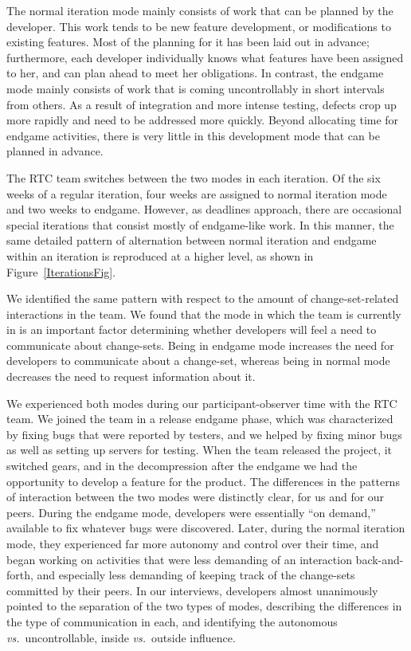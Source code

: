 The normal iteration mode mainly consists of work that can be planned by the developer. This work tends to be new feature development, or modifications to existing features. Most of the planning for it has been laid out in advance; furthermore, each developer individually knows what features have been assigned to her, and can plan ahead to meet her obligations.
In contrast, the endgame mode mainly consists of work that is coming uncontrollably in short intervals from others. As a result of integration and more intense testing, defects crop up more rapidly and need to be addressed more quickly. Beyond allocating time for endgame activities, there is very little in this development mode that can be planned in advance.

The RTC team switches between the two modes in each iteration. Of the six weeks of a regular iteration, four weeks are assigned to normal iteration mode and two weeks to endgame. However, as deadlines approach, there are occasional special iterations that consist mostly of endgame-like work. In this manner, the same detailed pattern of alternation between normal iteration and endgame within an iteration is reproduced at a higher level, as shown in Figure~\ref{IterationsFig}.

We identified the same pattern with respect to the amount of change-set-related interactions in the team. We found that the mode in which the team is currently in is an important factor determining whether developers will feel a need to communicate about change-sets. Being in endgame mode increases the need for developers to communicate about a change-set, whereas being in normal mode decreases the need to request information about it.

We experienced both modes during our participant-observer time with the RTC team. We joined the team in a release endgame phase, which was characterized by fixing bugs that were reported by testers, and we helped by fixing minor bugs as well as setting up servers for testing. When the team released the project, it switched gears, and in the decompression after the endgame we had the opportunity to develop a feature for the product. The differences in the patterns of interaction between the two modes were distinctly clear, for us and for our peers. During the endgame mode, developers were essentially ``on demand,'' available to fix whatever bugs were discovered. Later, during the normal iteration mode, they experienced far more autonomy and control over their time, and began working on activities that were less demanding of an interaction back-and-forth, and especially less demanding of keeping track of the change-sets committed by their peers. In our interviews, developers almost unanimously pointed to the separation of the two types of modes, describing the differences in the type of communication in each, and identifying the autonomous \emph{vs.}~uncontrollable, inside \emph{vs.}~outside influence.

